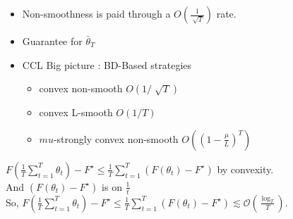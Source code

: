 \begin{itemize}
    \item Non-smoothness is paid through a $ O(\frac{1}{\sqrt[]{T}}) $ rate. 
    
    \item Guarantee for $ \bar{\theta} _T $ 
    
    \item CCL Big picture : BD-Based strategies 
    \begin{itemize}
        \item convex non-smooth $ O(1 / \sqrt[]{T}) $ 
        \item convex L-smooth $ O(1 / T) $ 
        \item $ mu $-strongly convex non-smooth $ O( ( 1 - \frac{\mu }{L})^T ) $ 
    \end{itemize}
\end{itemize}
$F(\frac{1}{T} \sum^T_{t=1} \theta_t) - F^{\star } \leq \frac{1}{T} \sum^T_{t=1} (F(\theta _t) - F^{\star })$ by convexity. \\
And $(F(\theta _t) - F^{\star })$ is on $\frac{1}{t}$ \\
So, $F(\frac{1}{T} \sum^T_{t=1} \theta_t) - F^{\star } \leq \frac{1}{T} \sum^T_{t=1} (F(\theta _t) - F^{\star }) \lesssim \mathcal{O}(\frac{\log_{T}}{T})$.

